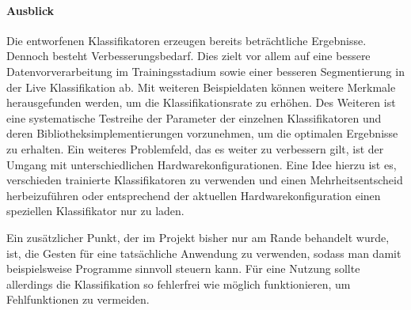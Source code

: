 \paragraph{Ausblick} 
Die entworfenen Klassifikatoren erzeugen bereits beträchtliche Ergebnisse.
Dennoch besteht Verbesserungsbedarf. Dies zielt vor allem auf eine bessere
Datenvorverarbeitung im Trainingsstadium sowie einer besseren Segmentierung in
der Live Klassifikation ab. Mit weiteren Beispieldaten können weitere Merkmale
herausgefunden werden, um die Klassifikationsrate zu erhöhen. Des Weiteren ist
eine systematische Testreihe der Parameter der einzelnen Klassifikatoren und
deren Bibliotheksimplementierungen vorzunehmen, um die optimalen Ergebnisse zu
erhalten. Ein weiteres Problemfeld, das es weiter zu verbessern gilt, ist der
Umgang mit unterschiedlichen Hardwarekonfigurationen. Eine Idee hierzu ist es,
verschieden trainierte Klassifikatoren zu verwenden und einen Mehrheitsentscheid
herbeizuführen oder entsprechend der aktuellen Hardwarekonfiguration einen
speziellen Klassifikator nur zu laden. 

Ein zusätzlicher Punkt, der im Projekt bisher nur am Rande behandelt wurde, ist, die Gesten für eine tatsächliche Anwendung zu verwenden, sodass man damit beispielsweise Programme sinnvoll steuern kann. Für eine Nutzung sollte allerdings die Klassifikation so fehlerfrei wie möglich funktionieren, um Fehlfunktionen zu vermeiden.









